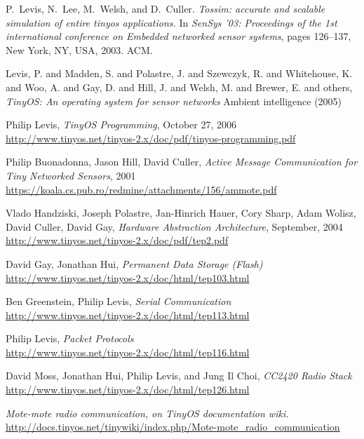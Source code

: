 \begin{thebibliography}{99}
  P.~Levis, N.~Lee, M.~Welsh, and D.~Culler.
  \textit{Tossim: accurate and scalable
  simulation of entire tinyos applications.}
  \newblock In {\em SenSys '03: Proceedings of the
  1st international conference on Embedded
  networked sensor systems}, pages 126--137, New
  York, NY, USA, 2003. ACM.

  Levis, P. and Madden, S. and Polastre, J. and Szewczyk, R. and Whitehouse, K. and Woo, A. and Gay, D. and Hill, J. and Welsh, M. and Brewer, E. and others,
  \textit{TinyOS: An operating system for sensor networks}
  Ambient intelligence (2005)

  Philip Levis, \textit{TinyOS Programming}, October 27, 2006 \\
  \url{http://www.tinyos.net/tinyos-2.x/doc/pdf/tinyos-programming.pdf}

  Philip Buonadonna, Jason Hill, David Culler,
  \textit{Active Message Communication for Tiny Networked Sensors}, 2001 \\
  \url{https://koala.cs.pub.ro/redmine/attachments/156/ammote.pdf}

  Vlado Handziski, Joseph Polastre, Jan-Hinrich Hauer, Cory Sharp,
  Adam Wolisz, David Culler, David Gay, \textit{Hardware Abstraction Architecture}, September,  2004 \\
  \url{http://www.tinyos.net/tinyos-2.x/doc/pdf/tep2.pdf}

  David Gay, Jonathan Hui, \textit{Permanent Data Storage (Flash)} \\
  \url{http://www.tinyos.net/tinyos-2.x/doc/html/tep103.html}

  Ben Greenstein, Philip Levis, \textit{Serial Communication} \\
  \url{http://www.tinyos.net/tinyos-2.x/doc/html/tep113.html}

  Philip Levis, \textit{Packet Protocols} \\
  \url{http://www.tinyos.net/tinyos-2.x/doc/html/tep116.html}

  David Moss, Jonathan Hui, Philip Levis, and Jung Il Choi,
  \textit{CC2420 Radio Stack} \\
  \url{http://www.tinyos.net/tinyos-2.x/doc/html/tep126.html}

  \textit{Mote-mote radio communication, on TinyOS documentation wiki.} \\
  \url{http://docs.tinyos.net/tinywiki/index.php/Mote-mote_radio_communication}


\end{thebibliography}

